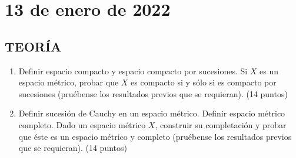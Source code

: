 \newpage

\section{13 de enero de 2022}

\subsection*{TEORÍA}
\begin{enumerate}
    \item Definir espacio compacto y espacio compacto por sucesiones. Si $X$ es un espacio métrico, probar que $X$ es compacto si y sólo si es compacto por sucesiones (pruébense los resultados previos que se requieran). \hfill (14 puntos)
    \item Definir sucesión de Cauchy en un espacio métrico. Definir espacio métrico completo. Dado un espacio métrico $X$, construir su completación y probar que éste es un espacio métrico y completo (pruébense los resultados previos que se requieran). \hfill (14 puntos)
\end{enumerate}


